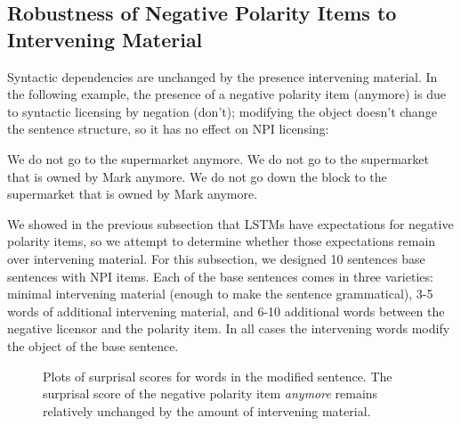 \documentclass[11pt]{article}
\begin{document}
\subsection{Robustness of Negative Polarity Items to Intervening Material}
Syntactic dependencies are unchanged by the presence intervening material. In the following example, the presence of a negative polarity item (anymore) is due to syntactic licensing by negation (don't); modifying the object doesn't change the sentence structure, so it has no effect on NPI licensing:
\begin{exe}
\ex
\begin{xlist}
\ex We do not go to the supermarket anymore.
\ex We do not go to the supermarket that is owned by Mark anymore.
\ex We do not go down the block to the supermarket that is owned by Mark anymore. 
\end{xlist}
\end{exe}
We showed in the previous subsection that LSTMs have expectations for negative polarity items, so we attempt to determine whether those expectations remain over intervening material. For this subsection, we designed 10 sentences base sentences with NPI items. Each of the base sentences comes in three varieties: minimal intervening material (enough to make the sentence grammatical), 3-5 words of additional intervening material, and 6-10 additional words between the negative licensor and the polarity item. In all cases the intervening words modify the object of the base sentence.

\begin{figure}
    \centering
    \caption{Plots of surprisal scores for words in the modified sentence. The surprisal score of the negative polarity item \textit{anymore} remains relatively unchanged by the amount of intervening material.}
\end{figure}
\end{document}
